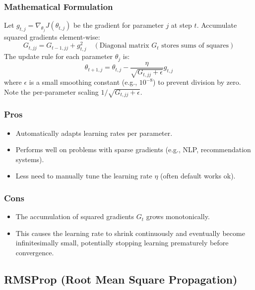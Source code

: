 \documentclass{article}
\begin{document}
\subsubsection{Mathematical Formulation}
Let $g_{t,j} = \nabla_{\theta_j} J(\theta_{t,j})$ be the gradient for parameter $j$ at step $t$. Accumulate squared gradients element-wise:
\begin{equation}
    G_{t,jj} = G_{t-1,jj} + g_{t,j}^2 \quad (\text{Diagonal matrix } G_t \text{ stores sums of squares})
\end{equation}
The update rule for each parameter $\theta_j$ is:
\begin{equation}
    \theta_{t+1, j} = \theta_{t, j} - \frac{\eta}{\sqrt{G_{t,jj} + \epsilon}} g_{t,j}
\end{equation}
where $\epsilon$ is a small smoothing constant (e.g., $10^{-8}$) to prevent division by zero. Note the per-parameter scaling $1/\sqrt{G_{t,jj}+\epsilon}$.

\subsubsection{Pros}
\begin{itemize}
    \item Automatically adapts learning rates per parameter.
    \item Performs well on problems with sparse gradients (e.g., NLP, recommendation systems).
    \item Less need to manually tune the learning rate $\eta$ (often default works ok).
\end{itemize}

\subsubsection{Cons}
\begin{itemize}
    \item The accumulation of squared gradients $G_t$ grows monotonically.
    \item This causes the learning rate to shrink continuously and eventually become infinitesimally small, potentially stopping learning prematurely before convergence.
\end{itemize}

\subsection{RMSProp (Root Mean Square Propagation)}
\end{document}
